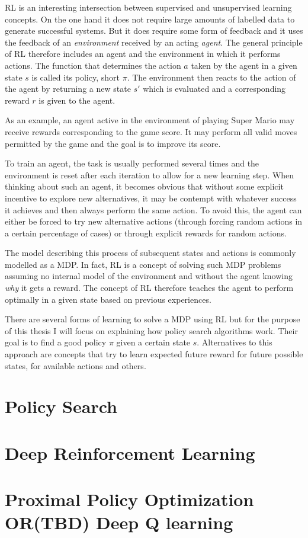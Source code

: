 \ac {RL} is an interesting intersection between supervised and unsupervised learning concepts. On the one hand it does not require large amounts of labelled data to generate successful systems. But it does require some form of feedback and it uses the feedback of an \emph{environment} received by an acting \emph{agent}.
The general principle of \ac {RL} therefore includes an agent and the environment in which it performs actions. The function that determines the action $a$  taken by the agent in a given state $s$ is called its policy, short $\pi$. The environment then reacts to the action of the agent by returning a new state $s'$ which is evaluated and a corresponding reward $r$ is given to the agent.

As an example, an agent active in the environment of playing Super Mario may receive rewards corresponding to the game score. It may perform all valid moves permitted by the game and the goal is to improve its score. 

To train an agent, the task is usually performed several times and the environment is reset after each iteration to allow for a new learning step.  
When thinking about such an agent, it becomes obvious that without some explicit incentive to explore new alternatives, it may be contempt with whatever success it achieves and then always perform the same action. To avoid this, the agent can either be forced to try new alternative actions (through forcing random actions in a certain percentage of cases) or through explicit rewards for random actions.

The model describing this process of subsequent states and actions is commonly modelled as a \ac {MDP}. In fact, \ac {RL} is a concept of solving such \ac {MDP} problems assuming no internal model of the environment and without the agent knowing \emph{why} it gets a reward. The concept of \ac {RL} therefore teaches the agent to perform optimally in a given state based on previous experiences. 

There are several forms of learning to solve a \ac {MDP} using \ac {RL} but for the purpose of this thesis I will focus on explaining how policy search algorithms work. Their goal is to find a good policy $\pi$ given a certain state $s$. Alternatives to this approach are concepts that try to learn expected future reward for future possible states, for available actions and others. %


\section{Policy Search}
\section{Deep Reinforcement Learning}

\section{Proximal Policy Optimization OR(TBD) Deep Q learning}
